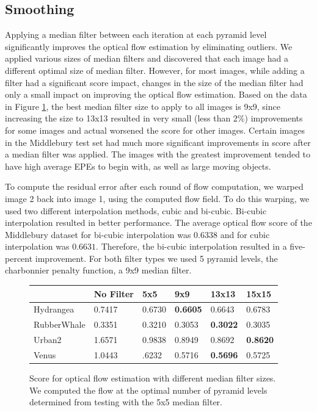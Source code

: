 \documentclass[10pt,twocolumn,letterpaper]{article}
\begin{document}
\subsection{Smoothing}
Applying a median filter between each iteration at each pyramid level significantly improves the optical flow estimation by eliminating outliers. We applied various sizes of median filters and discovered that each image had a different optimal size of median filter. However, for most images, while adding a filter had a significant score impact, changes in the size of the median filter had only a small impact on improving the optical flow estimation.  Based on the data in Figure \ref{fig:medFiltTable}, the best median filter size to apply to all images is 9x9, since increasing the size to 13x13 resulted in very small (less than 2\%) improvements for some images and actual worsened the score for other images. Certain images in the Middlebury test set had much more significant improvements in score after a median filter was applied.  The images with the greatest improvement tended to have high average EPEs to begin with, as well as large moving objects.

To compute the residual error after each round of flow computation, we warped image 2 back into image 1, using the computed flow field.  To do this warping, we used two different interpolation methods, cubic and bi-cubic. Bi-cubic interpolation resulted in better performance. The average optical flow score of the Middlebury dataset for bi-cubic interpolation was $0.6338$ and for cubic interpolation was $0.6631$. Therefore, the bi-cubic interpolation resulted in a five-percent improvement. For both filter types we used 5 pyramid levels, the charbonnier penalty function, a 9x9 median filter.

\begin{figure}
\begin{tabularx}{1.0\textwidth} {|X |X |X |X |X |X|}
\hline
 & No Filter & 5x5 & 9x9 & 13x13 & 15x15 \\
\hline 
Hydrangea & 0.7417 & 0.6730 & \bf{0.6605} & 0.6643 & 0.6783 \\
\hline 
RubberWhale & 0.3351 & 0.3210 & 0.3053 & \bf{0.3022} &  0.3035\\
\hline 
Urban2 &  1.6571 & 0.9838 & 0.8949 & 0.8692 & \bf{0.8620}\\
\hline 
Venus &  1.0443 & .6232 & 0.5716 & \bf{0.5696} &  0.5725 \\
\hline
\end{tabularx}
\caption{Score for optical flow estimation with different median filter sizes. We computed the flow at the optimal number of pyramid levels determined from testing with the 5x5 median filter.}
\label{fig:medFiltTable}
\end{figure}
\end{document}
